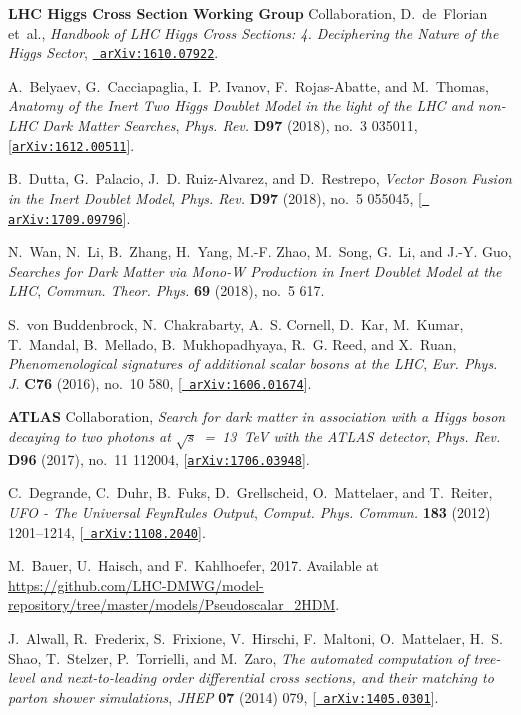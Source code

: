 \documentclass[a4paper, 11pt,notoc]{article}
\begin{document}
\begin{thebibliography}{100}
{\bf LHC Higgs Cross Section Working Group} Collaboration, D.~de~Florian
  et~al., {\it {Handbook of LHC Higgs Cross Sections: 4. Deciphering the Nature
  of the Higgs Sector}},  \href{http://arxiv.org/abs/1610.07922}{{\tt
  arXiv:1610.07922}}.

A.~Belyaev, G.~Cacciapaglia, I.~P. Ivanov, F.~Rojas-Abatte, and M.~Thomas, {\it
  {Anatomy of the Inert Two Higgs Doublet Model in the light of the LHC and
  non-LHC Dark Matter Searches}},  {\em Phys. Rev.} {\bf D97} (2018), no.~3
  035011, [\href{http://arxiv.org/abs/1612.00511}{{\tt arXiv:1612.00511}}].

B.~Dutta, G.~Palacio, J.~D. Ruiz-Alvarez, and D.~Restrepo, {\it {Vector Boson
  Fusion in the Inert Doublet Model}},  {\em Phys. Rev.} {\bf D97} (2018),
  no.~5 055045, [\href{http://arxiv.org/abs/1709.09796}{{\tt
  arXiv:1709.09796}}].

N.~Wan, N.~Li, B.~Zhang, H.~Yang, M.-F. Zhao, M.~Song, G.~Li, and J.-Y. Guo,
  {\it {Searches for Dark Matter via Mono-W Production in Inert Doublet Model
  at the LHC}},  {\em Commun. Theor. Phys.} {\bf 69} (2018), no.~5 617.

S.~von Buddenbrock, N.~Chakrabarty, A.~S. Cornell, D.~Kar, M.~Kumar, T.~Mandal,
  B.~Mellado, B.~Mukhopadhyaya, R.~G. Reed, and X.~Ruan, {\it {Phenomenological
  signatures of additional scalar bosons at the LHC}},  {\em Eur. Phys. J.}
  {\bf C76} (2016), no.~10 580, [\href{http://arxiv.org/abs/1606.01674}{{\tt
  arXiv:1606.01674}}].

{\bf ATLAS} Collaboration, {\it {Search for dark matter in
  association with a Higgs boson decaying to two photons at $\sqrt{s}$~=~13~TeV
  with the ATLAS detector}},  {\em Phys. Rev.} {\bf D96} (2017), no.~11 112004,
  [\href{http://arxiv.org/abs/1706.03948}{{\tt arXiv:1706.03948}}].

C.~Degrande, C.~Duhr, B.~Fuks, D.~Grellscheid, O.~Mattelaer, and T.~Reiter,
  {\it {UFO - The Universal FeynRules Output}},  {\em Comput. Phys. Commun.}
  {\bf 183} (2012) 1201--1214, [\href{http://arxiv.org/abs/1108.2040}{{\tt
  arXiv:1108.2040}}].

M.~Bauer, U.~Haisch, and F.~Kahlhoefer, 2017.
\newblock Available at
  \url{https://github.com/LHC-DMWG/model-repository/tree/master/models/Pseudoscalar_2HDM}.

J.~Alwall, R.~Frederix, S.~Frixione, V.~Hirschi, F.~Maltoni, O.~Mattelaer,
  H.~S. Shao, T.~Stelzer, P.~Torrielli, and M.~Zaro, {\it {The automated
  computation of tree-level and next-to-leading order differential cross
  sections, and their matching to parton shower simulations}},  {\em JHEP} {\bf
  07} (2014) 079, [\href{http://arxiv.org/abs/1405.0301}{{\tt
  arXiv:1405.0301}}].


\end{thebibliography}
\end{document}
